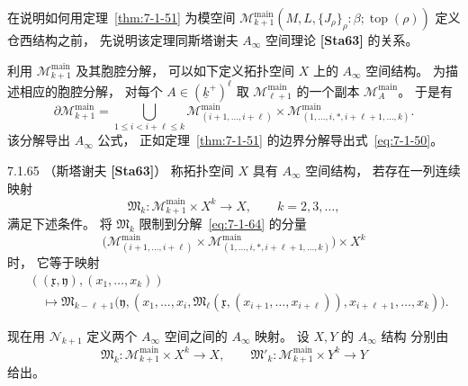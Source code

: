 
在说明如何用定理~\ref{thm:7-1-51}
为模空间
$\mathcal M^{\mathrm{main}}_{k+1}
(M,L,\{J_\rho\}_\rho:\beta;\operatorname{top}(\rho))$
定义仓西结构之前，
先说明该定理同斯塔谢夫
$A_\infty$ 空间理论 \textbf{[Sta63]}
的关系。

利用
$\mathcal M^{\mathrm{main}}_{k+1}$
及其胞腔分解，
可以如下定义拓扑空间 $X$
上的 $A_\infty$ 空间结构。
为描述相应的胞腔分解，
对每个
$A\in(\underline{k}^{+})^\ell$
取
$\mathcal M^{\mathrm{main}}_{\ell+1}$
的一个副本
$\mathcal M_A^{\mathrm{main}}$。
于是有
\begin{equation}
\partial\mathcal M^{\mathrm{main}}_{k+1}
=
\bigcup_{1\le i<i+\ell\le k}
\mathcal M^{\mathrm{main}}_{(i+1,\ldots,i+\ell)}
\times
\mathcal M^{\mathrm{main}}_{(1,\ldots,i,*,i+\ell+1,\ldots,k)}.
\tag{7.1.64}\label{eq:7-1-64}
\end{equation}
该分解导出 $A_\infty$ 公式，
正如定理~\ref{thm:7-1-51}
的边界分解导出式~\eqref{eq:7-1-50}。

\begin{definition}{7.1.65}\label{def:7-1-65}
（斯塔谢夫 \textbf{[Sta63]}）
称拓扑空间 $X$ 具有
$A_\infty$ 空间结构，
若存在一列连续映射
\[
\mathfrak M_k\colon
\mathcal M^{\mathrm{main}}_{k+1}\times X^k
\longrightarrow X,
\qquad k=2,3,\ldots,
\]
满足下述条件。
将 $\mathfrak M_k$
限制到分解~\eqref{eq:7-1-64}
的分量
\[
\bigl(
\mathcal M^{\mathrm{main}}_{(i+1,\ldots,i+\ell)}
\times
\mathcal M^{\mathrm{main}}_{(1,\ldots,i,*,i+\ell+1,\ldots,k)}
\bigr)\times X^k
\]
时，
它等于映射
\[
\begin{aligned}
&((\mathfrak x,\mathfrak y),
(x_1,\ldots,x_k))\\
&\quad\longmapsto
\mathfrak M_{k-\ell+1}
\bigl(
\mathfrak y,
(x_1,\ldots,x_i,
\mathfrak M_\ell(
\mathfrak x,(x_{i+1},\ldots,x_{i+\ell})),
x_{i+\ell+1},\ldots,x_k)
\bigr).
\end{aligned}
\]
\end{definition}

现在用 $\mathcal N_{k+1}$
定义两个 $A_\infty$ 空间之间的
$A_\infty$ 映射。
设 $X,Y$ 的 $A_\infty$ 结构
分别由
\[
\mathfrak M_k\colon
\mathcal M^{\mathrm{main}}_{k+1}\times X^k
\longrightarrow X,
\qquad
\mathfrak M'_k\colon
\mathcal M^{\mathrm{main}}_{k+1}\times Y^k
\longrightarrow Y
\]
给出。

